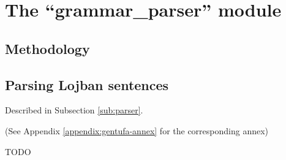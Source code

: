 \chapter{The ``grammar\_parser'' module}

\section{Methodology}

\section{Parsing Lojban sentences}
\label{sec:parsing_lojban_sentences}

Described in Subsection \ref{sub:parser}.



(See Appendix \ref{appendix:gentufa-annex} for the corresponding annex)

TODO